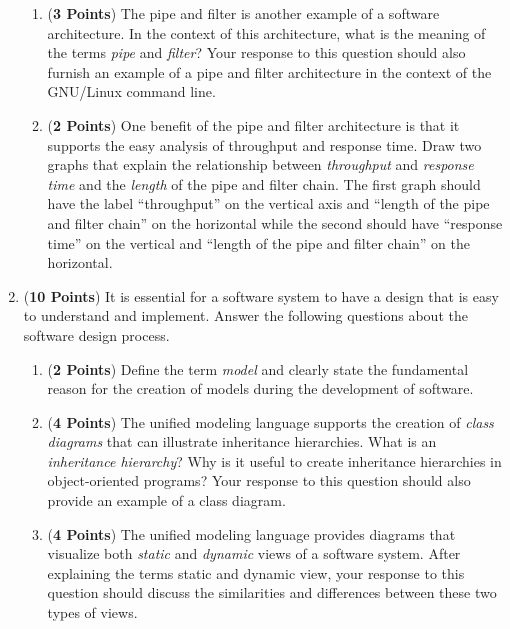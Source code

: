 \documentclass[12pt,epsf,psfig,graphicx]{article}
\begin{document}
\begin{enumerate}
\begin{enumerate}
\item ({\bf 3 Points}) The pipe and filter is another example of a
  software architecture.  In the context of this architecture, what is
  the meaning of the terms {\em pipe} and {\em filter}?  Your response
  to this question should also furnish an example of a pipe and filter
  architecture in the context of the GNU/Linux command line.

\item ({\bf 2 Points}) One benefit of the pipe and filter architecture
  is that it supports the easy analysis of throughput and response
  time.  Draw two graphs that explain the relationship between {\em
    throughput} and {\em response time} and the {\em length} of the
  pipe and filter chain.  The first graph should have the label
  ``throughput'' on the vertical axis and ``length of the pipe and
  filter chain'' on the horizontal while the second should have
  ``response time'' on the vertical and ``length of the pipe and
  filter chain'' on the horizontal.

\end{enumerate}

\newpage


\item ({\bf 10 Points}) It is essential for a software system to have
  a design that is easy to understand and implement.  Answer the
  following questions about the software design process.

\begin{enumerate}

\item ({\bf 2 Points}) Define the term {\em model} and clearly state
  the fundamental reason for the creation of models during the
  development of software.

\item ({\bf 4 Points}) The unified modeling language supports the
  creation of {\em class diagrams} that can illustrate inheritance
  hierarchies.  What is an {\em inheritance hierarchy}?  Why is it
  useful to create inheritance hierarchies in object-oriented
  programs?  Your response to this question should also provide an
  example of a class diagram.

\item ({\bf 4 Points}) The unified modeling language provides
  diagrams that visualize both {\em static} and {\em dynamic} views of
  a software system.  After explaining the terms static and dynamic
  view, your response to this question should discuss the similarities
  and differences between these two types of views.


\end{enumerate}
\end{enumerate}
\end{document}
